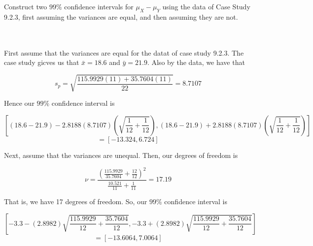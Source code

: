 Construct two $99\%$ confidence intervals for $\mu_X-\mu_Y$ using the data of Case Study 9.2.3, first
assuming the variances are equal, and then assuming they are not.\\\\

\begin{solution}\renewcommand{\qedsymbol}{}\ \\
    First assume that the variances are equal for the datat of case study 9.2.3. The case study gicves
    us that $\bar{x}=18.6$ and $\bar{y}=21.9$. Also by the data, we have that
    
    $$s_p=\sqrt{\frac{115.9929(11)+35.7604(11)}{22}}=8.7107$$
    
    Hence our $99\%$ confidence interval is
    
    $$[(18.6-21.9)-2.8188(8.7107)(\sqrt{\frac{1}{12}+\frac{1}{12}}),
    (18.6-21.9)+2.8188(8.7107)(\sqrt{\frac{1}{12}+\frac{1}{12}})]$$
    $$=[-13.324, 6.724]$$
    
    Next, assume that the variances are unequal. Then, our degrees of freedom is
    
    $$\nu=\frac{(\frac{115.9929}{35.7604}+\frac{12}{12})^2}{\frac{10.521}{11}+\frac{1}{11}}=17.19$$
    
    That is, we have 17 degrees of freedom. So, our $99\%$ confidence interval is
    
    $$[-3.3-(2.8982)\sqrt{\frac{115.9929}{12}+\frac{35.7604}{12}},
    -3.3+(2.8982)\sqrt{\frac{115.9929}{12}+\frac{35.7604}{12}}]$$
    $$=[-13.6064, 7.0064]$$

\end{solution}